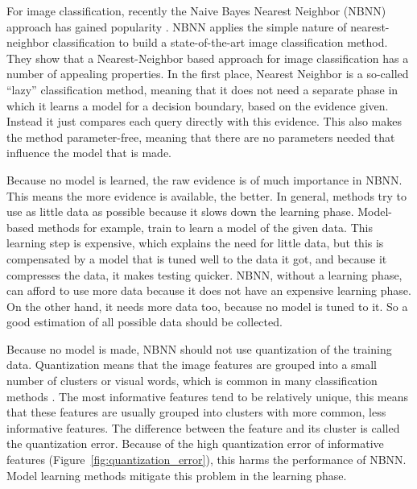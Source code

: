 For image classification, recently the Naive Bayes Nearest Neighbor (NBNN) \cite{boiman2008defense} approach has gained popularity \cite{becker2012codebook, behmo2010towards, mccann2012local, timofte2012iterative, tuytelaars2011nbnn, wang2011improved, zhang2010random}. NBNN applies the simple nature of nearest-neighbor classification to build a state-of-the-art image classification method. They show that a Nearest-Neighbor based approach for image classification has a number of appealing properties. In the first place, Nearest Neighbor is a so-called ``lazy'' classification method, meaning that it does not need a separate phase in which it learns a model for a decision boundary, based on the evidence given. Instead it just compares each query directly with this evidence. This also makes the method parameter-free, meaning that there are no parameters needed that influence the model that is made.

Because no model is learned, the raw evidence is of much importance in NBNN. This means the more evidence is available, the better. In general, methods try to use as little data as possible because it slows down the learning phase. Model-based methods for example, train to learn a model of the given data. This learning step is expensive, which explains the need for little data, but this is compensated by a model that is tuned well to the data it got, and because it compresses the data, it makes testing quicker. NBNN, without a learning phase, can afford to use more data because it does not have an expensive learning phase. On the other hand, it needs more data too, because no model is tuned to it. So a good estimation of all possible data should be collected.

Because no model is made, NBNN should not use quantization of the training data. Quantization means that the image features are grouped into a small number of clusters or visual words, which is common in many classification methods \cite{chatfield2011devil, lazebnik2006beyond, liu2011defense, van2010visual, van2011exploiting, wang2010locality}. The most informative features tend to be relatively unique, this means that these features are usually grouped into clusters with more common, less informative features. The difference between the feature and its cluster is called the quantization error. Because of the high quantization error of informative features (Figure~\ref{fig:quantization_error}), this harms the performance of NBNN. Model learning methods mitigate this problem in the learning phase.

